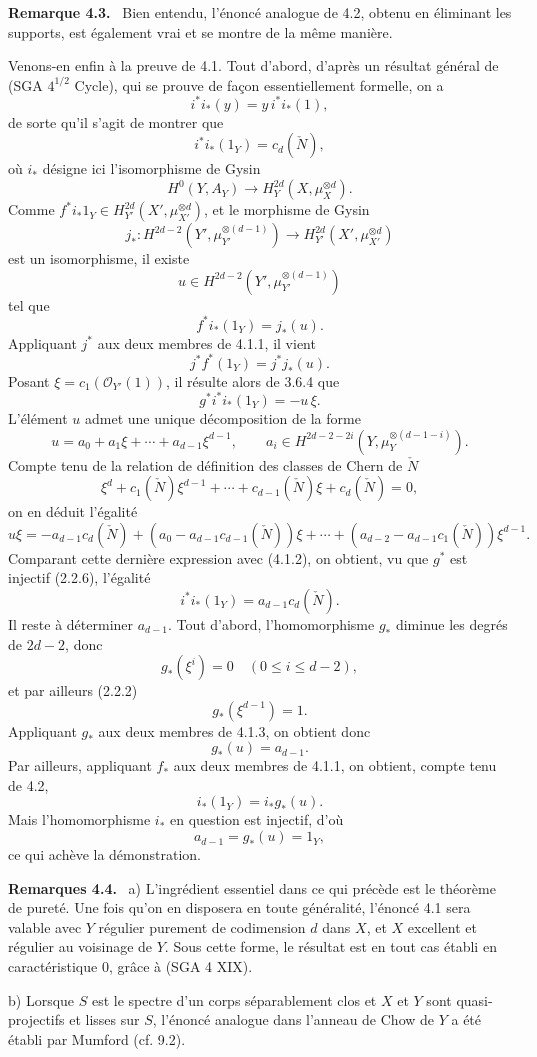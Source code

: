 \documentclass[11pt]{article}
\newenvironment{statement}[1]{\par\medskip\noindent\textbf{#1.}\ }{\par\medskip}
\begin{document}
\begin{statement}{Remarque 4.3}
Bien entendu, l'énoncé analogue de 4.2, obtenu en éliminant les supports, est également vrai et se montre de la même manière.
\end{statement}

Venons-en enfin à la preuve de 4.1. Tout d'abord, d'après un résultat général de (SGA $4^{1/2}$ Cycle), qui se prouve de façon essentiellement formelle, on a
\[
i^*i_*(y)=y\,i^*i_*(1),
\]
de sorte qu'il s'agit de montrer que
\[
i^*i_*(1_Y)=c_d(\check N),
\]
où $i_*$ désigne ici l'isomorphisme de Gysin
\[
H^0(Y,A_Y)\to H_Y^{2d}(X,\mu_X^{\otimes d}).
\]
Comme $f^*i_*1_Y\in H_{Y'}^{2d}(X',\mu_{X'}^{\otimes d})$, et le morphisme de Gysin
\[
j_*:H^{2d-2}(Y',\mu_{Y'}^{\otimes(d-1)})
\to H_{Y'}^{2d}(X',\mu_{X'}^{\otimes d})
\]
est un isomorphisme, il existe
\[
u\in H^{2d-2}(Y',\mu_{Y'}^{\otimes(d-1)})
\]
tel que
\[
f^*i_*(1_Y)=j_*(u).
\tag{4.1.1}
\]
Appliquant $j^*$ aux deux membres de 4.1.1, il vient
\[
j^*f^*(1_Y)=j^*j_*(u).
\]
Posant $\xi=c_1(\mathcal O_{Y'}(1))$, il résulte alors de 3.6.4 que
\[
g^*i^*i_*(1_Y)=-u\,\xi.
\tag{4.1.2}
\]
L'élément $u$ admet une unique décomposition de la forme
\[
u=a_0+a_1\xi+\cdots+a_{d-1}\xi^{d-1},
\qquad
a_i\in H^{2d-2-2i}(Y,\mu_Y^{\otimes(d-1-i)}).
\tag{4.1.3}
\]
Compte tenu de la relation de définition des classes de Chern de $\check N$
\[
\xi^d+c_1(\check N)\xi^{d-1}+\cdots+c_{d-1}(\check N)\xi+c_d(\check N)=0,
\tag{4.1.4}
\]
on en déduit l'égalité
\[
u\xi=-a_{d-1}c_d(\check N)+(a_0-a_{d-1}c_{d-1}(\check N))\xi
+\cdots+(a_{d-2}-a_{d-1}c_1(\check N))\xi^{d-1}.
\]
Comparant cette dernière expression avec (4.1.2), on obtient, vu que $g^*$ est injectif (2.2.6), l'égalité
\[
i^*i_*(1_Y)=a_{d-1}c_d(\check N).
\tag{4.1.5}
\]
Il reste à déterminer $a_{d-1}$. Tout d'abord, l'homomorphisme $g_*$ diminue les degrés de $2d-2$, donc
\[
g_*(\xi^i)=0\quad(0\le i\le d-2),
\]
et par ailleurs (2.2.2)
\[
g_*(\xi^{d-1})=1.
\]
Appliquant $g_*$ aux deux membres de 4.1.3, on obtient donc
\[
g_*(u)=a_{d-1}.
\tag{4.1.6}
\]
Par ailleurs, appliquant $f_*$ aux deux membres de 4.1.1, on obtient, compte tenu de 4.2,
\[
i_*(1_Y)=i_*g_*(u).
\tag{4.1.7}
\]
Mais l'homomorphisme $i_*$ en question est injectif, d'où
\[
a_{d-1}=g_*(u)=1_Y,
\]
ce qui achève la démonstration.

\begin{statement}{Remarques 4.4}
a) L'ingrédient essentiel dans ce qui précède est le théorème de pureté. Une fois qu'on en disposera en toute généralité, l'énoncé 4.1 sera valable avec $Y$ régulier purement de codimension $d$ dans $X$, et $X$ excellent et régulier au voisinage de $Y$. Sous cette forme, le résultat est en tout cas établi en caractéristique $0$, grâce à (SGA 4 XIX).

b) Lorsque $S$ est le spectre d'un corps séparablement clos et $X$ et $Y$ sont quasi-projectifs et lisses sur $S$, l'énoncé analogue dans l'anneau de Chow de $Y$ a été établi par Mumford (cf. 9.2).
\end{statement}
\end{document}
